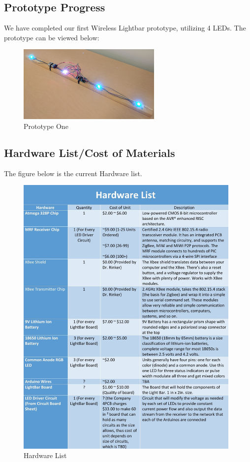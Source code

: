 \documentclass[12pt]{article}
\begin{document}
{{{{		\subsection{Prototype Progress}
			We have completed our first Wireless Lightbar prototype, utilizing 4 LEDs. The prototype can be viewed below:
			
			\begin{figure}[ht!]
				\centering
				\includegraphics[width=70mm]{assets/prototype.jpg}
				\caption{Prototype One}
			\end{figure}
	
		\subsection{Hardware List/Cost of Materials}
			The figure below is the current Hardware list.
			
			\begin{figure}[ht!]
				\centering
				\includegraphics[width=110mm]{assets/HardwareList.jpg}
				\caption{Hardware List \label{overflow}}
			\end{figure}
		
}}}}
\end{document}
